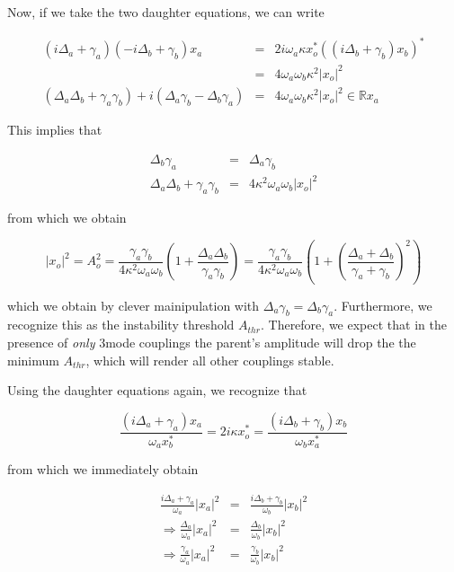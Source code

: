 Now, if we take the two daughter equations, we can write

\begin{eqnarray}
(i\Delta_a+\gamma_a)(-i\Delta_b+\gamma_b)x_a & = & 2i\omega_a \kappa x_o^\ast \left( (i\Delta_b+\gamma_b)x_b \right)^\ast \\
& = & 4\omega_a\omega_b\kappa^2 |x_o|^2 \\
(\Delta_a\Delta_b + \gamma_a\gamma_b) + i(\Delta_a\gamma_b - \Delta_b\gamma_a) & = & 4\omega_a\omega_b\kappa^2 |x_o|^2 \in \mathbb{R} x_a
\end{eqnarray}

This implies that

\begin{eqnarray}
\Delta_b\gamma_a & = & \Delta_a\gamma_b \\
\Delta_a\Delta_b + \gamma_a\gamma_b & = & 4\kappa^2\omega_a\omega_b|x_o|^2
\end{eqnarray}

from which we obtain

\begin{equation}
|x_o|^2 = A_o^2 = \frac{\gamma_a\gamma_b}{4\kappa^2\omega_a\omega_b}\left(1+\frac{\Delta_a\Delta_b}{\gamma_a\gamma_b}\right) = \frac{\gamma_a\gamma_b}{4\kappa^2\omega_a\omega_b}\left(1+\left(\frac{\Delta_a + \Delta_b}{\gamma_a+\gamma_b}\right)^2 \right)
\end{equation}

which we obtain by clever mainipulation with $\Delta_a\gamma_b = \Delta_b\gamma_a$. Furthermore, we recognize this as the instability threshold $A_{thr}$. Therefore, we expect that in the presence of \emph{only} 3mode couplings the parent's amplitude will drop the the minimum $A_{thr}$, which will render all other couplings stable. 

Using the daughter equations again, we recognize that

\begin{equation}
\frac{(i\Delta_a+\gamma_a)x_a}{\omega_a x_b^\ast} = 2i\kappa x_o^\ast = \frac{(i\Delta_b+\gamma_b)x_b}{\omega_b x_a^\ast}
\end{equation}

from which we immediately obtain

\begin{eqnarray}
\frac{i\Delta_a+\gamma_a}{\omega_a}|x_a|^2 & = & \frac{i\Delta_b+\gamma_b}{\omega_b}|x_b|^2 \\
\Rightarrow \frac{\Delta_a}{\omega_a}|x_a|^2 & = & \frac{\Delta_b}{\omega_b}|x_b|^2 \\
\Rightarrow \frac{\gamma_a}{\omega_a}|x_a|^2 & = & \frac{\gamma_b}{\omega_b}|x_b|^2
\end{eqnarray}

